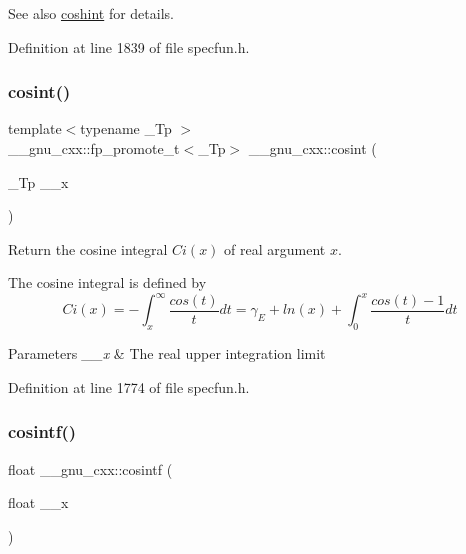 \begin{DoxySeeAlso}{See also}
\hyperlink{group__gnu__math__spec__func_ga2411d513d418180285ace6650c7b7e31}{coshint} for details. 
\end{DoxySeeAlso}


Definition at line 1839 of file specfun.\+h.

\mbox{\label{group__gnu__math__spec__func_gafd398869cde057087e6b3428a1d13a93}} 
\subsubsection{\texorpdfstring{cosint()}{cosint()}}
{\footnotesize\ttfamily template$<$typename \+\_\+\+Tp $>$ \\
\+\_\+\+\_\+gnu\+\_\+cxx\+::fp\+\_\+promote\+\_\+t$<$\+\_\+\+Tp$>$ \+\_\+\+\_\+gnu\+\_\+cxx\+::cosint (\begin{DoxyParamCaption}\item[{\+\_\+\+Tp}]{\+\_\+\+\_\+x }\end{DoxyParamCaption})\hspace{0.3cm}{\ttfamily [inline]}}

Return the cosine integral $ Ci(x) $ of real argument $ x $.

The cosine integral is defined by \[ Ci(x) = -\int_x^\infty \frac{cos(t)}{t}dt = \gamma_E + ln(x) + \int_0^x \frac{cos(t)-1}{t}dt \]


\begin{DoxyParams}{Parameters}
{\em \+\_\+\+\_\+x} & The real upper integration limit \\
\hline
\end{DoxyParams}


Definition at line 1774 of file specfun.\+h.

\mbox{\label{group__gnu__math__spec__func_ga87202351dc97d2c69e42bf58f911fb5a}} 
\subsubsection{\texorpdfstring{cosintf()}{cosintf()}}
{\footnotesize\ttfamily float \+\_\+\+\_\+gnu\+\_\+cxx\+::cosintf (\begin{DoxyParamCaption}\item[{float}]{\+\_\+\+\_\+x }\end{DoxyParamCaption})\hspace{0.3cm}{\ttfamily [inline]}}

